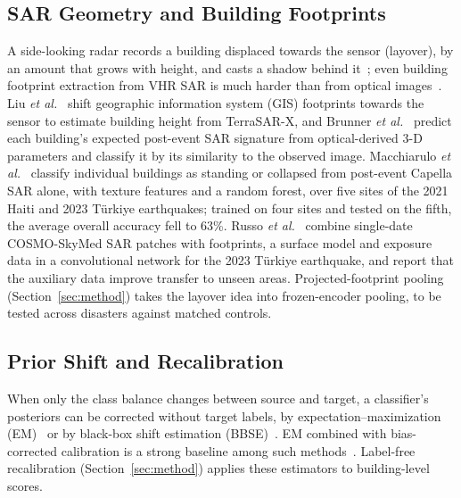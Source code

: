 \documentclass{ieeeaccess}
\begin{document}
\subsection{SAR Geometry and Building Footprints}
A side-looking radar records a building displaced towards the sensor (layover), by an amount that grows with height, and casts a shadow behind it~\cite{moreira2013tutorial}; even building footprint extraction from VHR SAR is much harder than from optical images~\cite{shermeyer2020spacenet6}. Liu \emph{et al.}~\cite{liu2014height} shift geographic information system (GIS) footprints towards the sensor to estimate building height from TerraSAR-X, and Brunner \emph{et al.}~\cite{brunner2010earthquake} predict each building's expected post-event SAR signature from optical-derived 3-D parameters and classify it by its similarity to the observed image. Macchiarulo \emph{et al.}~\cite{macchiarulo2025sar} classify individual buildings as standing or collapsed from post-event Capella SAR alone, with texture features and a random forest, over five sites of the 2021 Haiti and 2023 T\"urkiye earthquakes; trained on four sites and tested on the fifth, the average overall accuracy fell to 63\%. Russo \emph{et al.}~\cite{russo2026cosmo} combine single-date COSMO-SkyMed SAR patches with footprints, a surface model and exposure data in a convolutional network for the 2023 T\"urkiye earthquake, and report that the auxiliary data improve transfer to unseen areas. Projected-footprint pooling (Section~\ref{sec:method}) takes the layover idea into frozen-encoder pooling, to be tested across disasters against matched controls.

\subsection{Prior Shift and Recalibration}
When only the class balance changes between source and target, a classifier's posteriors can be corrected without target labels, by expectation--maximization (EM)~\cite{saerens2002adjusting} or by black-box shift estimation (BBSE)~\cite{lipton2018bbse}. EM combined with bias-corrected calibration is a strong baseline among such methods~\cite{alexandari2020bcts}. Label-free recalibration (Section~\ref{sec:method}) applies these estimators to building-level scores.
\end{document}
